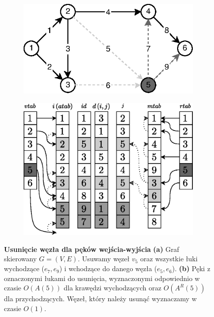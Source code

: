 \begin{figure}[!htbp]
	\centering
	\begin{subfigure}[b]{0.55\textwidth}
		\includegraphics[width=\textwidth]{Chapter_I/7/1_7a.eps}
		\caption{}
	\end{subfigure}%
	\qquad
	\begin{subfigure}[b]{0.4\textwidth}
		\includegraphics[width=\textwidth]{Chapter_I/7/1_7b.eps}
		\caption{}
	\end{subfigure}
	\caption{\textbf{Usunięcie węzła dla pęków wejścia-wyjścia} \textbf{(a)} Graf skierowany $G = \left( V, E \right)$. Usuwamy węzeł $v_{5}$ oraz wszystkie łuki wychodzące ($e_{7}, e_{9}$) i wchodzące do danego węzła ($e_{5}, e_{6}$). \textbf{(b)} Pęki z oznaczonymi łukami do usunięcia, wyznaczonymi odpowiednio w czasie $ O \left( A \left( 5 \right) \right)$ dla krawędzi wychodzących oraz $ O \left( A^{R} \left( 5 \right) \right)$ dla przychodzących. Węzeł, który należy usunąć wyznaczamy w czasie $ O \left( 1 \right)$. }
	\label{fig:forwardReverseStarRepresentationDeleteNode}
\end{figure}

